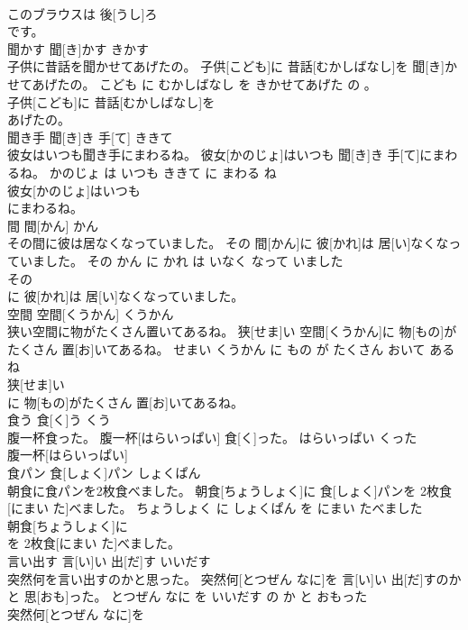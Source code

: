 \documentclass[8pt]{extreport}
\begin{document}
\begin{CJK}{UTF8}{min}
\\	このブラウスは 後[うし]ろ
\\	です。			
\\	聞かす	聞[き]かす	きかす	
\\	子供に昔話を聞かせてあげたの。	子供[こども]に 昔話[むかしばなし]を 聞[き]かせてあげたの。	こども に むかしばなし を きかせてあげた の 。	
\\	子供[こども]に 昔話[むかしばなし]を
\\	あげたの。			
\\	聞き手	聞[き]き 手[て]	ききて	
\\	彼女はいつも聞き手にまわるね。	彼女[かのじょ]はいつも 聞[き]き 手[て]にまわるね。	かのじょ は いつも ききて に まわる ね	
\\	彼女[かのじょ]はいつも
\\	にまわるね。			
\\	間	間[かん]	かん	
\\	その間に彼は居なくなっていました。	その 間[かん]に 彼[かれ]は 居[い]なくなっていました。	その かん に かれ は いなく なって いました	
\\	その
\\	に 彼[かれ]は 居[い]なくなっていました。			
\\	空間	空間[くうかん]	くうかん	
\\	狭い空間に物がたくさん置いてあるね。	狭[せま]い 空間[くうかん]に 物[もの]がたくさん 置[お]いてあるね。	せまい くうかん に もの が たくさん おいて ある ね	
\\	狭[せま]い
\\	に 物[もの]がたくさん 置[お]いてあるね。			
\\	食う	食[く]う	くう	
\\	腹一杯食った。	腹一杯[はらいっぱい] 食[く]った。	はらいっぱい くった	
\\	腹一杯[はらいっぱい]
\\	食パン	食[しょく]パン	しょくぱん	
\\	朝食に食パンを2枚食べました。	朝食[ちょうしょく]に 食[しょく]パンを 2枚食[にまい た]べました。	ちょうしょく に しょくぱん を にまい たべました	
\\	朝食[ちょうしょく]に
\\	を 2枚食[にまい た]べました。			
\\	言い出す	言[い]い 出[だ]す	いいだす	
\\	突然何を言い出すのかと思った。	突然何[とつぜん なに]を 言[い]い 出[だ]すのかと 思[おも]った。	とつぜん なに を いいだす の か と おもった	
\\	突然何[とつぜん なに]を

\end{CJK}
\end{document}
